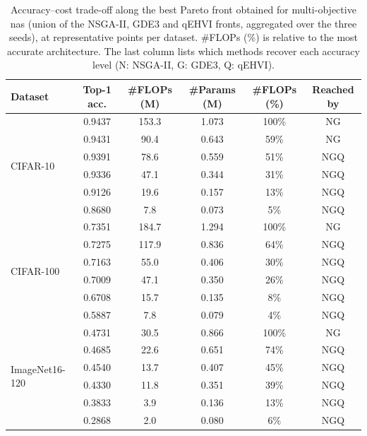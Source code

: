\begin{table}[!ht]
    \centering
    \caption{Accuracy--cost trade-off along the best Pareto front obtained for multi-objective \acrshort{nas} (union of the NSGA-II, GDE3 and qEHVI fronts, aggregated over the three seeds), at representative points per dataset. \#FLOPs (\%) is relative to the most accurate architecture. The last column lists which methods recover each accuracy level (N: NSGA-II, G: GDE3, Q: qEHVI).}
    \label{tab:study2_mo_tradeoff}
    \setlength{\tabcolsep}{5pt}
    \begin{tabular}{lccccc}
        \toprule
        \textbf{Dataset} & \textbf{Top-1 acc.} & \textbf{\#FLOPs (M)} & \textbf{\#Params (M)} & \textbf{\#FLOPs (\%)} & \textbf{Reached by} \\
        \midrule
        \multirow{6}{*}{CIFAR-10} & 0.9437 & 153.3 & 1.073 & 100\% & NG \\
         & 0.9431 & 90.4 & 0.643 & 59\% & NG \\
         & 0.9391 & 78.6 & 0.559 & 51\% & NGQ \\
         & 0.9336 & 47.1 & 0.344 & 31\% & NGQ \\
         & 0.9126 & 19.6 & 0.157 & 13\% & NGQ \\
         & 0.8680 & 7.8  & 0.073 & 5\%  & NGQ \\
        \midrule
        \multirow{6}{*}{CIFAR-100} & 0.7351 & 184.7 & 1.294 & 100\% & NG \\
         & 0.7275 & 117.9 & 0.836 & 64\% & NGQ \\
         & 0.7163 & 55.0 & 0.406 & 30\% & NGQ \\
         & 0.7009 & 47.1 & 0.350 & 26\% & NGQ \\
         & 0.6708 & 15.7 & 0.135 & 8\%  & NGQ \\
         & 0.5887 & 7.8  & 0.079 & 4\%  & NGQ \\
        \midrule
        \multirow{6}{*}{ImageNet16-120} & 0.4731 & 30.5 & 0.866 & 100\% & NG \\
         & 0.4685 & 22.6 & 0.651 & 74\% & NGQ \\
         & 0.4540 & 13.7 & 0.407 & 45\% & NGQ \\
         & 0.4330 & 11.8 & 0.351 & 39\% & NGQ \\
         & 0.3833 & 3.9  & 0.136 & 13\% & NGQ \\
         & 0.2868 & 2.0  & 0.080 & 6\%  & NGQ \\
        \bottomrule
    \end{tabular}
\end{table}

